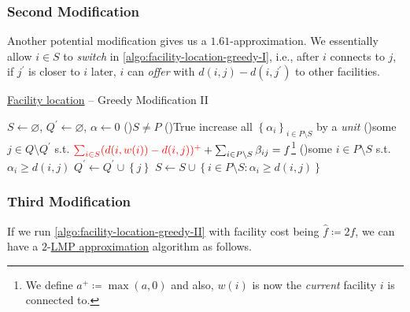\subsubsection{Second Modification}
Another potential modification gives us a \(1.61\)-approximation. We essentially allow \(i\in S\) to \emph{switch} in \autoref{algo:facility-location-greedy-I}, i.e., after \(i\) connects to \(j\), if \(j^\prime \) is closer to \(i\) later, \(i\) can \emph{offer} with \(d(i, j) - d(i, j^\prime )\) to other facilities.

\begin{algorithm}[H]\label{algo:facility-location-greedy-II}
	\DontPrintSemicolon
	\caption{\hyperref[prb:facility-location]{Facility location} -- Greedy Modification II}
	\BlankLine
	\(S\gets \varnothing \), \(Q^\prime \gets \varnothing \), \(\alpha \gets 0\) 
	\;
	\While(){\(S \neq P\)}{
	\While(){\textsf{True}}{
	increase all \(\left\{ \alpha _i \right\}_{i\in P\setminus S} \) by a \emph{unit}\;
	\If(){some \(j\in Q\setminus Q^\prime \) s.t. \(\mathcolor{red}{\sum_{i\in S} (d(i, w(i)) - d(i, j))^+ } + \sum_{i\in P\setminus S} \beta _{ij} = f\)\footnote{We define \(a^+ \coloneqq \max (a, 0)\) and also, \(w(i)\) is now the \emph{current} facility \(i\) is connected to.}}{
			\Break
		}
		\If(){some \(i\in P\setminus S\) s.t. \(\alpha_i \geq d(i, j)\)}{
			\Break
		}
	}
	\(Q^\prime \gets Q^\prime  \cup \left\{ j \right\} \)
	\(S\gets S \cup \left\{ i\in P\setminus S\colon \alpha _i \geq d(i, j)\right\} \)
	}
	\;
\end{algorithm}

\subsubsection{Third Modification}
If we run \autoref{algo:facility-location-greedy-II} with facility cost being \(\hat{f} \coloneqq 2f\), we can have a \(2\)-\hyperref[def:LMP]{LMP approximation} algorithm as follows.

